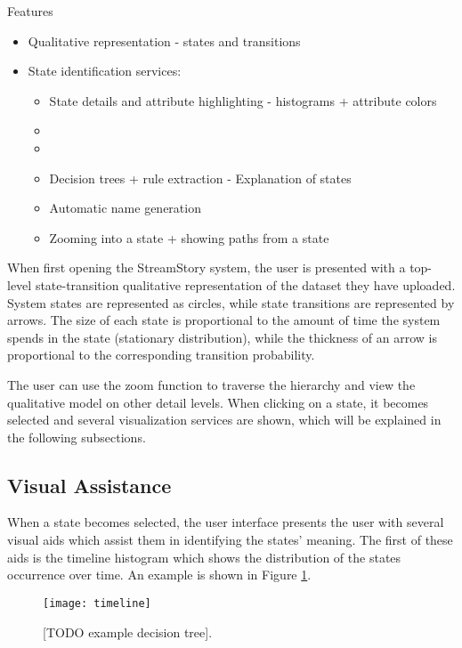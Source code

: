 Features  
\begin{itemize}
	\item Qualitative representation - states and transitions
	\item State identification services:
	\begin{itemize}
		\item State details and attribute highlighting - histograms + attribute colors
		\item {}
		\item {}
		\item Decision trees + rule extraction - Explanation of states
		\item Automatic name generation
		\item Zooming into a state + showing paths from a state
	\end{itemize}
\end{itemize}

When first opening the StreamStory system, the user is presented with a top-level state-transition qualitative representation
of the dataset they have uploaded. System states are represented as circles, while state transitions are
represented by arrows. The size of each state is proportional to the amount of time the system spends in
the state (stationary distribution), while the thickness of an arrow is proportional to the corresponding
transition probability.

The user can use the zoom function to traverse the hierarchy and view the qualitative model on other 
detail levels. When clicking on a state, it becomes selected and several visualization services are
shown, which will be explained in the following subsections.

\subsection{Visual Assistance}

When a state becomes selected, the user interface presents the user with several visual aids which
assist them in identifying the states' meaning. The first of these aids is the timeline histogram
which shows the distribution of the states occurrence over time. An example is shown in Figure 
\ref{fig:time-hist}.

\begin{figure}[h!]
	\centering
	\texttt{[image: timeline]}
	\caption{[TODO example decision tree].}
	\label{fig:time-hist}
\end{figure}

